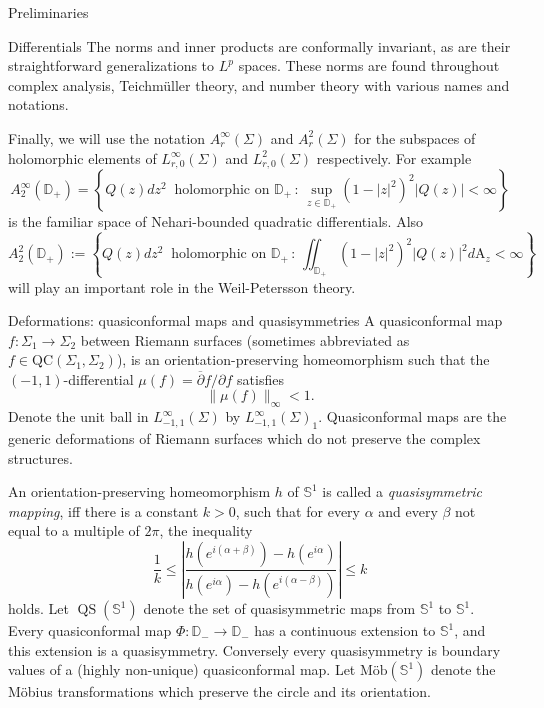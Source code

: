 \documentclass[12pt]{amsart}
\newcommand{\disk}{\ensuremath{\mathbb{D}} } %
\newcommand{\riem}{\Sigma}  %
\newcommand{\qs}{\operatorname{QS}}
\theoremstyle{plain}
\theoremstyle{definition}
\theoremstyle{remark}
\numberwithin{equation}{section} %
\numberwithin{figure}{section} %
\begin{document}
\begin{section}{Preliminaries}
\begin{subsection}{Differentials}
 The norms and inner products are conformally invariant, as are their straightforward generalizations to $L^p$ spaces. These norms are found throughout complex analysis, Teichm\"uller theory, and number theory with various names and notations.  

 Finally, we will use the notation $A^\infty_r(\riem)$ and $A^2_r(\riem)$ for the subspaces of holomorphic elements of $L^\infty_{r,0}(\riem)$ and $L^2_{r,0}(\riem)$ respectively.   For example 
 \[  A_2^\infty(\disk_+) =  \left\{ Q(z)dz^2  \ \text{ holomorphic on } \disk_+ \,:\,
    \sup_{z \in \disk_+} (1-|z|^2)^2|Q(z)| < \infty \right\}   \]
    is the familiar space of Nehari-bounded quadratic differentials. Also
  \[  A_2^2(\disk_+) :=  \left\{ Q(z)dz^2  \ \text{ holomorphic on } \disk_+ \,:\,
   \iint_{\disk_+} (1-|z|^2)^2|Q(z)|^2 d\mathrm{A}_z < \infty \right\}  \]
  will play an important role in the Weil-Petersson theory.
\end{subsection}
\begin{subsection}{Deformations: quasiconformal maps and quasisymmetries}
 A quasiconformal map $f:\riem_1 \rightarrow \riem_2$ between Riemann surfaces (sometimes abbreviated as $f\in \mathrm{QC}(\riem_1, \riem_2)$), is an orientation-preserving homeomorphism such that the $(-1,1)$-differential  $\mu(f) = \overline{\partial} f/\partial f$ satisfies
 \[   \| \mu(f) \|_\infty < 1.   \]
 Denote the unit ball in $L^\infty_{-1,1}(\riem)$ by $L^\infty_{-1,1}(\riem)_1$. Quasiconformal maps are the generic deformations of Riemann surfaces which do not preserve the complex structures. 
  
 An orientation-preserving homeomorphism $h$ of $\mathbb{S}^1$ is called a \emph{quasisymmetric mapping}, iff there is a constant $k>0$, such that for every $\alpha$ and every $\beta$ not equal to a multiple of $2\pi$, the inequality \[  \frac{1}{k} \leq \left| \frac{h(e^{i(\alpha+\beta)})-h(e^{i\alpha})}{h(e^{i\alpha})-h(e^{i(\alpha-\beta)})} \right|
    \leq k \]
holds. Let $\qs(\mathbb{S}^1)$ denote the set of quasisymmetric maps from $\mathbb{S}^1$ to $\mathbb{S}^1$.  Every quasiconformal map $\Phi:\disk_- \rightarrow \disk_-$ has a continuous extension to $\mathbb{S}^1$, and this extension is a quasisymmetry. Conversely every quasisymmetry is boundary values of a (highly non-unique) quasiconformal map. Let $\text{M\"ob}(\mathbb{S}^1)$ denote the M\"obius transformations which preserve the circle and its orientation.\\ 


\end{subsection}
\end{section}
\end{document}
